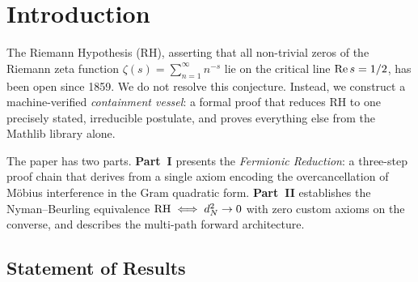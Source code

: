 \documentclass[11pt,a4paper]{article}
\begin{document}
\begin{abstract}
The formalization comprises $\sim$504 active Lean files
($\sim$160{,}000 lines; $\sim$618 files and $\sim$185{,}000 lines
including archived explorations) with zero compilation errors.
The proof introduces techniques of independent interest:
the \emph{Parseval Bridge}, bypassing the Vasyunin cotangent formula;
the \emph{Glass Bridge Identity} $G = R +
\tfrac{1}{4}\mathbf{1}\mathbf{1}^T$, reducing RH to GCD arithmetic;
the \emph{Cholesky Decrement} $d^2_{N+1} = d^2_N -
y^2_{\mathrm{new}}$, proving monotone vacuum extraction;
the \emph{Ward Identity} connecting the SUSY decomposition
to M\"obius universality;
and the \emph{Euler--Mascheroni Rate}, identifying $\gamma$ as
the master parameter governing convergence in the hi-lo
decomposition.
The \emph{Oracle Bridge} provides a Flyspeck-style conditional
certificate from DD-precision GPU computation.
Companion Rust experiments (50+ programs, f64--512-bit MPFR--DD)
validate the spectral correspondence to $10^{-17}$ precision at
$N = 55{,}440$.
\end{abstract}

\clearpage
\tableofcontents

\section{Introduction}
\label{sec:intro}

The Riemann Hypothesis (RH), asserting that all non-trivial zeros of
the Riemann zeta function $\zeta(s) = \sum_{n=1}^\infty n^{-s}$
lie on the critical line $\operatorname{Re} s = 1/2$, has been open since 1859.
We do not resolve this conjecture. Instead, we construct a
machine-verified \emph{containment vessel}: a formal proof that
reduces RH to one precisely stated, irreducible postulate,
and proves everything else from the Mathlib library alone.

The paper has two parts. \textbf{Part~I} presents the
\emph{Fermionic Reduction}: a three-step proof chain that derives
 from a single axiom encoding the
overcancellation of M\"obius interference in the Gram quadratic form.
\textbf{Part~II} establishes the Nyman--Beurling equivalence
$\mathrm{RH} \iff d_N^2 \to 0$ with zero custom axioms on the converse,
and describes the multi-path forward architecture.

\subsection{Statement of Results}
\end{document}
